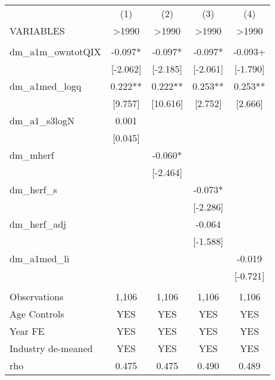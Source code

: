 \documentclass[]{article}
\begin{document}
\begin{tabular}{lcccc} \hline
 & (1) & (2) & (3) & (4) \\
VARIABLES & >1990 & >1990 & >1990 & >1990 \\ \hline
 &  &  &  &  \\
dm\_a1m\_owntotQIX & -0.097* & -0.097* & -0.097* & -0.093+ \\
 & [-2.062] & [-2.185] & [-2.061] & [-1.790] \\
dm\_a1med\_logq & 0.222** & 0.222** & 0.253** & 0.253** \\
 & [9.757] & [10.616] & [2.752] & [2.666] \\
dm\_a1\_s3logN & 0.001 &  &  &  \\
 & [0.045] &  &  &  \\
dm\_mherf &  & -0.060* &  &  \\
 &  & [-2.464] &  &  \\
dm\_herf\_s &  &  & -0.073* &  \\
 &  &  & [-2.286] &  \\
dm\_herf\_adj &  &  & -0.064 &  \\
 &  &  & [-1.588] &  \\
dm\_a1med\_li &  &  &  & -0.019 \\
 &  &  &  & [-0.721] \\
 &  &  &  &  \\
Observations & 1,106 & 1,106 & 1,106 & 1,106 \\
Age Controls & YES & YES & YES & YES \\
Year FE & YES & YES & YES & YES \\
Industry de-meaned & YES & YES & YES & YES \\
 rho & 0.475 & 0.475 & 0.490 & 0.489 \\ \hline
\end{tabular}
\end{document}
